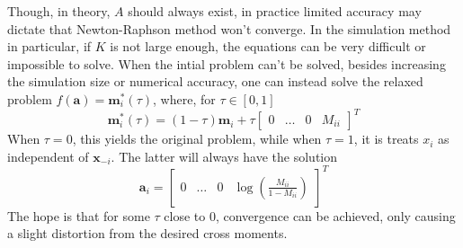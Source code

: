 \documentclass[11pt]{article}
\theoremstyle{definition}
\begin{document}
            Though, in theory, $A$ should always exist, in practice limited accuracy may dictate that Newton-Raphson method won't converge. In the simulation method in particular, if $K$ is not large enough, the equations can be very difficult or impossible to solve. When the intial problem can't be solved, besides increasing the simulation size or numerical accuracy, one can instead solve the relaxed problem  $f(\mathbf a)=\mathbf m_i^*(\tau)$, where, for $\tau\in[0,1]$
    \[\mathbf m_i^*(\tau) = (1-\tau)\mathbf m_i + \tau \left[ \begin{array}{cccc} 0 & \ldots & 0 & M_{ii} \end{array} \right]^T \]
            When $\tau=0$, this yields the original problem, while when $\tau=1$, it is treats $x_i$ as independent of $\mathbf x_{-i}$. The latter will always have the solution
            \[\mathbf a_i = \left[ \begin{array}{cccc} 0 & \ldots & 0 & \log\left(\frac{M_{ii}}{1-M_{ii}}\right) \end{array} \right]^T \]
            The hope is that for some $\tau$ close to $0$, convergence can be achieved, only causing a slight distortion from the desired cross moments.
\end{document}
